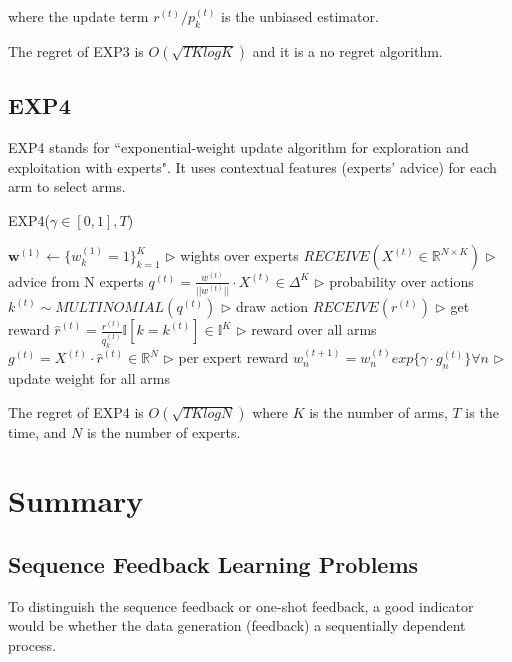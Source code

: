 \documentclass[11pt]{article}
\begin{document}
where the update term $r^{(t)}/p_k^{(t)}$ is the unbiased estimator.

The regret of EXP3 is $O(\sqrt{TK log K})$ and it is a no regret algorithm.

\subsection{EXP4}
EXP4 stands for ``exponential-weight update algorithm for exploration and exploitation with experts". It uses contextual features (experts' advice) for each arm to select arms.

\begin{algorithm}
\caption{EXP4($\gamma \in [0,1], T$)}
\begin{algorithmic}[1]

\State $\mathbf{w}^{(1)} \leftarrow \{ w_k^{(1)} = 1\}_{k=1}^{K}$ \hfill $\triangleright$ wights over experts
        \State $RECEIVE(X^{(t)} \in \mathbb{R}^{N \times K})$ \hfill $\triangleright$ advice from N experts
        \State $q^{(t)} = \frac{w^{(t)}}{||w^{(t)}||} \cdot X^{(t)} \in \Delta^K$ \hfill $\triangleright$ probability over actions
        \State $k^{(t)} \sim MULTINOMIAL(q^{(t)})$ \hfill $\triangleright$ draw action
        \State $RECEIVE(r^{(t)})$ \hfill $\triangleright$ get reward
        \State $\hat{r}^{(t)} = \frac{r^{(t)}}{q_{k}^{(t)}} \mathbb{I}[k = k^{(t)}] \in \mathbb{I}^K$ \hfill $\triangleright$ reward over all arms
        \State $g^{(t)} = X^{(t)} \cdot \hat{r}^{(t)} \in \mathbb{R}^N$ \hfill $\triangleright$ per expert reward
        \State $w_{n}^{(t+1)} = w_{n}^{(t)} exp\{\gamma \cdot g_n^{(t)}\} \forall n$ \hfill $\triangleright$ update weight for all arms
    \EndFor
\end{algorithmic}
\end{algorithm}

The regret of EXP4 is $O(\sqrt{TK log N})$ where $K$ is the number of arms, $T$ is the time, and $N$ is the number of experts.

\section{Summary}

\subsection{Sequence Feedback Learning Problems}
To distinguish the sequence feedback or one-shot feedback, a good indicator would be whether the data generation (feedback) a sequentially dependent process.
\end{document}
